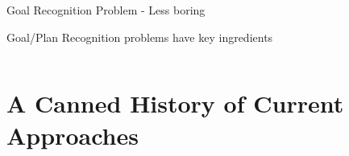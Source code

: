 \documentclass[usenames,dvipsnames]{beamer}
\begin{document}
\begin{frame}[c]{Goal Recognition Problem - Less boring}
\begin{block}{Goal/Plan Recognition problems have  key ingredients}
\begin{columns}
\begin{column}{.3\textwidth}
\begin{center}
			\end{center}
		\end{column}
	\end{columns}
	
	\end{block}

\end{frame}

\section{A Canned History of Current Approaches}

\end{document}
